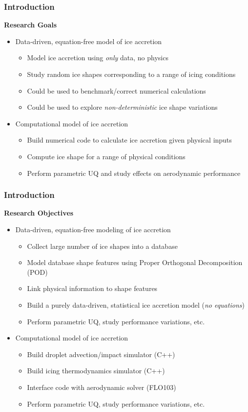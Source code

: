 \documentclass[9pt]{beamer}
\begin{document}
\begin{frame}
\frametitle{Introduction}
\label{sec-1-4}

\textbf{Research Goals}

\begin{itemize}
\item Data-driven, equation-free model of ice accretion
\begin{itemize}
\item Model ice accretion using \emph{only} data, no physics
\item Study random ice shapes corresponding to a range of icing conditions
\item Could be used to benchmark/correct numerical calculations
\item Could be used to explore \emph{non-deterministic} ice shape variations
\end{itemize}
\item Computational model of ice accretion
\begin{itemize}
\item Build numerical code to calculate ice accretion given physical inputs
\item Compute ice shape for a range of physical conditions
\item Perform parametric UQ and study effects on aerodynamic performance
\end{itemize}
\end{itemize}
\end{frame}
\begin{frame}
\frametitle{Introduction}
\label{sec-1-5}

\textbf{Research Objectives}

\begin{itemize}
\item Data-driven, equation-free modeling of ice accretion
\begin{itemize}
\item Collect large number of ice shapes into a database
\item Model database shape features using Proper Orthogonal Decomposition (POD)
\item Link physical information to shape features
\item Build a purely data-driven, statistical ice accretion model (\emph{no equations})
\item Perform parametric UQ, study performance variations, etc.
\end{itemize}
\item Computational model of ice accretion
\begin{itemize}
\item Build droplet advection/impact simulator (C++)
\item Build icing thermodynamics simulator (C++)
\item Interface code with aerodynamic solver (FLO103)
\item Perform parametric UQ, study performance variations, etc.
\end{itemize}
\end{itemize}
\end{frame}
\end{document}
